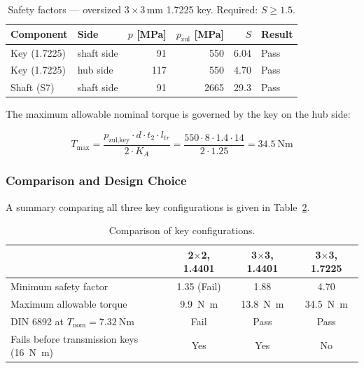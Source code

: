 \documentclass[11pt,a4paper,twoside,openright]{book}
\begin{document}
\begin{table}[htbp]
    \centering
    \begin{tabular}{l l r r r l}
        \hline
        \textbf{Component} & \textbf{Side} & $p$ [\si{\mega\pascal}] & $p_{\text{zul}}$ [\si{\mega\pascal}] & $S$ & \textbf{Result} \\
        \hline
        Key (1.7225)   & shaft side & 91  & 550  & 6.04  & Pass \\
        Key (1.7225)   & hub side   & 117 & 550  & 4.70  & Pass \\
        Shaft (S7)      & shaft side & 91  & 2665 & 29.3  & Pass \\
        \hline
    \end{tabular}
    \caption{Safety factors --- oversized $3 \times 3$\,\si{\milli\metre} 1.7225 key. Required: $S \geq 1.5$.}
    \label{tab:sf_3x3_42crmo4}
\end{table}
 
The maximum allowable nominal torque is governed by the key on the hub side:
 
\begin{equation}
    T_{\max} = \frac{p_{\text{zul,key}} \cdot d \cdot t_2 \cdot l_{tr}}{2 \cdot K_A} = \frac{550 \cdot 8 \cdot 1.4 \cdot 14}{2 \cdot 1.25} = \SI{34.5}{\newton\metre}
    \label{eq:t_max_3x3_42crmo4}
\end{equation}
 
\subsubsection{Comparison and Design Choice}
\label{subsec:referToThisFea}
A summary comparing all three key configurations is given in Table~\ref{tab:key_comparison}.
 
\begin{table}[htbp]
    \centering
    \begin{tabular}{l c c c}
        \hline
        & \textbf{2$\times$2, 1.4401} & \textbf{3$\times$3, 1.4401} & \textbf{3$\times$3, 1.7225} \\
        \hline
        Minimum safety factor           & 1.35 (Fail)       & 1.88              & 4.70 \\
        Maximum allowable torque        & \SI{9.9}{\newton\metre}  & \SI{13.8}{\newton\metre}  & \SI{34.5}{\newton\metre} \\
        DIN 6892 at $T_{\text{nom}} = \SI{7.32}{\newton\metre}$ & Fail  & Pass              & Pass \\
        Fails before transmission keys (\SI{16}{\newton\metre}) & Yes    & Yes               & No \\
        \hline
    \end{tabular}
    \caption{Comparison of key configurations.}
    \label{tab:key_comparison}
\end{table}
 
\end{document}
